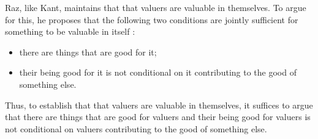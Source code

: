 \documentclass[12pt]{article}
\begin{document}
% 
% 
% 
% 

Raz, like Kant, maintains that that valuers are valuable in themselves. To argue for this, he proposes that the following two conditions are jointly sufficient for something to be valuable in itself \citep[151--2]{Raz:2001ps}:
\begin{itemize}
	\item there are things that are good for it;
	\item their being good for it is not conditional on it contributing to the good of something else. 
\end{itemize}
Thus, to establish that that valuers are valuable in themselves, it suffices to argue that there are things that are good for valuers and their being good for valuers is not conditional on valuers contributing to the good of something else. 
\end{document}

